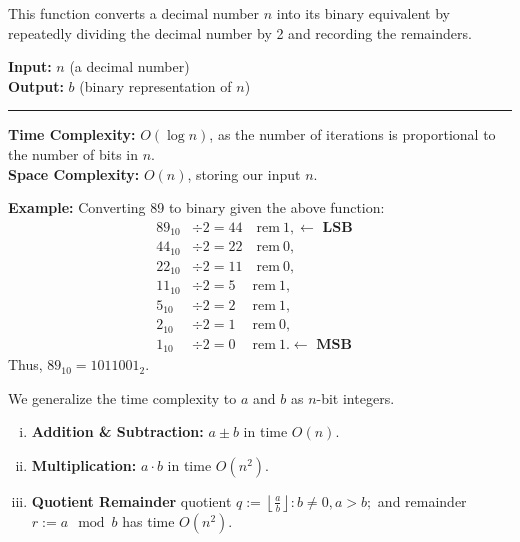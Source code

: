 \newpage
\begin{Func}
    This function converts a decimal number $n$ into its binary equivalent by repeatedly dividing the decimal number by 2 and recording the remainders.

    \vspace{.5em}
    \noindent
    \textbf{Input:} $n$ (a decimal number)\\
    \textbf{Output:} $b$ (binary representation of $n$)\\

    \begin{algorithm}[H]
        \SetAlgoLined
    \end{algorithm}
    \noindent\rule{\textwidth}{0.4pt}
    
    \noindent
    \textbf{Time Complexity:} $O(\log n)$, as the number of iterations is proportional to the number of bits in $n$.\\
    \textbf{Space Complexity:} $O(n)$, storing our input $n$.
\end{Func}

\noindent
\textbf{Example:} Converting 89 to binary given the above function:
\begin{align*}
    89_{10} &\div 2 = 44 \quad \text{rem} \ 1, \longleftarrow \textbf{ LSB}&   \\
    44_{10} &\div 2 = 22 \quad \text{rem} \ 0,& \\
    22_{10} &\div 2 = 11 \quad \text{rem} \ 0,& \\
    11_{10} &\div 2 = 5 \quad \ \text{rem} \ 1,& \\
    5_{10} &\div 2 = 2 \quad \ \text{rem} \ 1,& \\
    2_{10} &\div 2 = 1 \quad \ \text{rem} \ 0,& \\
    1_{10} &\div 2 = 0 \quad \ \text{rem} \ 1.  \longleftarrow \textbf{ MSB} &  
\end{align*}
Thus, $89_{10} = 1011001_2$.

\begin{theo}
    
    \label{theo:basic-arithmetic}

    We generalize the time complexity to $a$ and $b$ as $n$-bit integers. 
    \begin{enumerate}[(i)]
        \item \textbf{Addition \& Subtraction:} $a \pm b$ in time $O(n)$.
        \item \textbf{Multiplication:} $a \cdot b$ in time $O(n^2)$.
        \item \textbf{Quotient Remainder} quotient $q := \left\lfloor \frac{a}{b} \right\rfloor: b \neq 0, a>b;$ and remainder $r := a \mod b$ has time $O(n^2)$.
    \end{enumerate}
\end{theo}